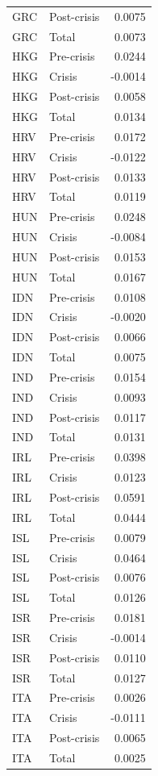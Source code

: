 \begin{longtable}[t]{llr}
\addlinespace
GRC & Post-crisis & 0.0075\\
GRC & Total & 0.0073\\
HKG & Pre-crisis & 0.0244\\
HKG & Crisis & -0.0014\\
HKG & Post-crisis & 0.0058\\
\addlinespace
HKG & Total & 0.0134\\
HRV & Pre-crisis & 0.0172\\
HRV & Crisis & -0.0122\\
HRV & Post-crisis & 0.0133\\
HRV & Total & 0.0119\\
\addlinespace
HUN & Pre-crisis & 0.0248\\
HUN & Crisis & -0.0084\\
HUN & Post-crisis & 0.0153\\
HUN & Total & 0.0167\\
IDN & Pre-crisis & 0.0108\\
\addlinespace
IDN & Crisis & -0.0020\\
IDN & Post-crisis & 0.0066\\
IDN & Total & 0.0075\\
IND & Pre-crisis & 0.0154\\
IND & Crisis & 0.0093\\
\addlinespace
IND & Post-crisis & 0.0117\\
IND & Total & 0.0131\\
IRL & Pre-crisis & 0.0398\\
IRL & Crisis & 0.0123\\
IRL & Post-crisis & 0.0591\\
\addlinespace
IRL & Total & 0.0444\\
ISL & Pre-crisis & 0.0079\\
ISL & Crisis & 0.0464\\
ISL & Post-crisis & 0.0076\\
ISL & Total & 0.0126\\
\addlinespace
ISR & Pre-crisis & 0.0181\\
ISR & Crisis & -0.0014\\
ISR & Post-crisis & 0.0110\\
ISR & Total & 0.0127\\
ITA & Pre-crisis & 0.0026\\
\addlinespace
ITA & Crisis & -0.0111\\
ITA & Post-crisis & 0.0065\\
ITA & Total & 0.0025\\

\end{longtable}
